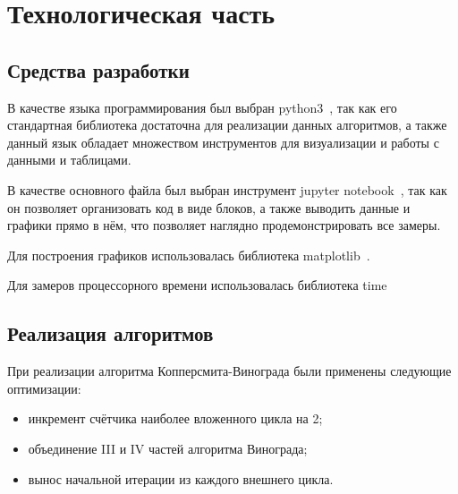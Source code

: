 \chapter{Технологическая часть}
\section{Средства разработки}

В качестве языка программирования был выбран python3~\cite{python3}, так как его стандартная библиотека достаточна для реализации данных алгоритмов, а также данный язык обладает множеством инструментов для визуализации и работы с данными и таблицами.

В качестве основного файла был выбран инструмент jupyter notebook~\cite{python3-jupyter}, так как он позволяет организовать код в виде блоков, а также выводить данные и графики прямо в нём, что позволяет наглядно продемонстрировать все замеры.

Для построения графиков использовалась библиотека matplotlib~\cite{python3-matplotlib}.

Для замеров процессорного времени использовалась библиотека time~\cite{python3-time}

\section{Реализация алгоритмов}



При реализации алгоритма Копперсмита-Винограда были применены следующие оптимизации:
\begin{itemize}
    \item инкремент счётчика наиболее вложенного цикла на 2; 
    \item объединение III и IV частей алгоритма Винограда; 
    \item вынос начальной итерации из каждого внешнего цикла.
\end{itemize}

\

\

